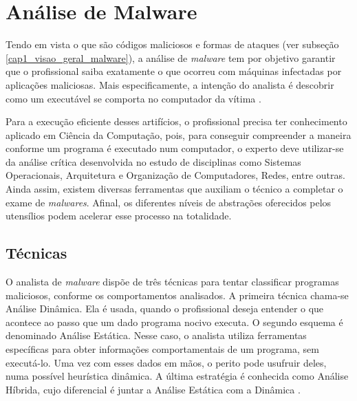 \section{Análise de Malware}

    \vspace{10.5cm}

    \hspace{1cm}
    Tendo em vista o que são códigos maliciosos e formas de ataques (ver subseção \ref{cap1_visao_geral_malware}), a análise de \textit{malware} tem por objetivo garantir que o profissional saiba exatamente o que ocorreu com máquinas infectadas por aplicações maliciosas. Mais especificamente, a intenção do analista é descobrir como um executável se comporta no computador da vítima \cite{sikorski2012}.
    
    \vspace{4mm}
    
    \hspace{1cm}
    Para a execução eficiente desses artifícios, o profissional precisa ter conhecimento aplicado em Ciência da Computação, pois, para conseguir compreender a maneira conforme um programa é executado num computador, o experto deve utilizar-se da análise crítica desenvolvida no estudo de disciplinas como Sistemas Operacionais, Arquitetura e Organização de Computadores, Redes, entre outras. Ainda assim, existem diversas ferramentas que auxiliam o técnico a completar o exame de \textit{malwares}. Afinal, os diferentes níveis de abstrações oferecidos pelos utensílios podem acelerar esse processo na totalidade.
    
    \subsection{Técnicas}
    
    \hspace{1cm}
    O analista de \textit{malware} dispõe de três técnicas para tentar classificar programas maliciosos, conforme os comportamentos analisados. A primeira técnica chama-se Análise Dinâmica. Ela é usada, quando o profissional deseja entender o que acontece ao passo que um dado programa nocivo executa. O segundo esquema é denominado Análise Estática. Nesse caso, o analista utiliza ferramentas específicas para obter informações comportamentais de um programa, sem executá-lo. Uma vez com esses dados em mãos, o perito pode usufruir deles, numa possível heurística dinâmica. A última estratégia é conhecida como Análise Híbrida, cujo diferencial é juntar a Análise Estática com a Dinâmica \cite{monteiro2018}.
        
